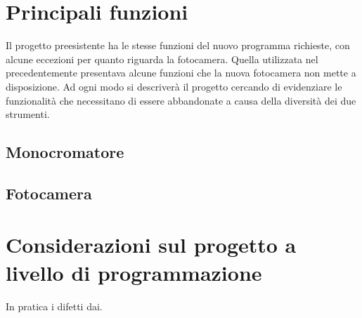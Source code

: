 \section{Principali funzioni}
Il progetto preesistente ha le stesse funzioni del nuovo programma richieste, con alcune eccezioni per quanto riguarda la fotocamera. Quella utilizzata nel precedentemente presentava alcune funzioni che la nuova fotocamera non mette a disposizione. Ad ogni modo si descriver\`a il progetto cercando di evidenziare le funzionalità che necessitano di essere abbandonate a causa della diversità dei due strumenti.
\subsection{Monocromatore}
\subsection{Fotocamera}

\section{Considerazioni sul progetto a livello di programmazione}

In pratica i difetti dai.